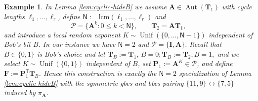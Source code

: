 \documentclass[onecolumn]{IEEEtran} %
\newcommand{\bA}{\mathbf A}
\newcommand{\bP}{\mathbf P}
\newcommand{\bF}{\mathbf F}
\newcommand{\bI}{\mathbf I}
\newcommand{\1}{\mathbbm{1}}
\DeclareMathOperator{\Aut}{Aut}
\theoremstyle{boldremark}
\newtheorem{example}{Example}
\newcommand{\bT}{\mathbf{T}}
\DeclareMathOperator{\Unif}{Unif}
\begin{document}
\begin{example}
In Lemma \ref{lem:cyclic-hideB} we assume $\bA\in\Aut(\bT_1)$ with cycle lengths
$\ell_1,\dots,\ell_r$, define \(\textsf{N}:=\mathrm{lcm}(\ell_1,\dots,\ell_r)\) and
\[
\mathcal P=\{\bA^k:0\le k<\textsf{N}\},\qquad \bT_2=\bA\bT_1,
\]
and introduce a local random exponent $K\sim\Unif(\{0,\dots,\textsf{N}-1\})$
independent of Bob's bit $B$. In our instance we have $\textsf{N}=2$ and
$\mathcal P=\{\bI,\bA\}$. Recall that $B\in\{0,1\}$ is Bob's choice and let
$  \bT_B :=     \bT_1, \, B=0; \bT_B :=  \bT_2,  B=1,$ and we select $K\sim\Unif(\{0,1\})$ independent of $B$, set
$\bP_1 := \bA^K\in\mathcal P$, and define $\bF := \bP_1^{\mathsf T}\bT_B$.
Hence this construction is exactly the $\textsf{N}=2$ specialization of
Lemma \ref{lem:cyclic-hideB} with the symmetric \gls{gbcs} and \gls{bbcs} pairing
$  \{11,9\}\longleftrightarrow\{7,5\}$ induced by $\pi_{\bA}$.
\end{example}
\end{document}
